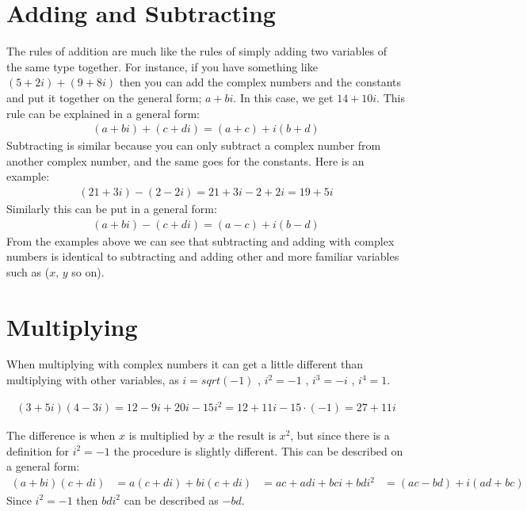 \section{Adding and Subtracting}
The rules of addition are much like the rules of simply adding two variables of the same type together. For instance, if you have something like $(5+2i)+(9+8i)$ then you can add the complex numbers and the constants and put it together on the general form; $a+bi$. In this case, we get $14+10i$. This rule can be explained in a general form: 
\begin{align*}
(a + bi) + (c + di) = (a + c) + i(b + d)
\end{align*}
Subtracting is similar because you can only subtract a complex number from another complex number, and the same goes for the constants. Here is an example:
\begin{align*}
(21 + 3i) - (2 - 2i) = 21 + 3i - 2 + 2i = 19 + 5i
\end{align*}
Similarly this can be put in a general form:
\begin{align*}
(a + bi) - (c + di) = (a - c) + i(b - d)
\end{align*}
From the examples above we can see that subtracting and adding with complex numbers is identical to subtracting and adding other and more familiar variables such as ($x$, $y$ so on).

\section{Multiplying}
When multiplying with complex numbers it can get a little different than multiplying with other variables, as $i=sqrt(-1)$ , $i^2=-1$ , $i^3=-i$ , $i^4=1$. \\
\begin{definition}

\begin{align*}
(3+5i)(4-3i) = 12 - 9i + 20i - 15i^2 = 12 + 11i - 15 \cdot (-1) = 27 + 11i
\end{align*}
\end{definition}
The difference is when $x$ is multiplied by $x$ the result is $x^2$, but since there is a definition for $i^2=-1$ the procedure is slightly different. 
This can be described on a general form:
\begin{align}
(a + bi)(c + di) &= a(c + di) + bi(c + di)
&= ac + adi + bci + bdi^2
&= (ac - bd) + i(ad + bc)
\end{align}
Since $i^2 = -1$ then $bdi^2$ can be described as $-bd$.



